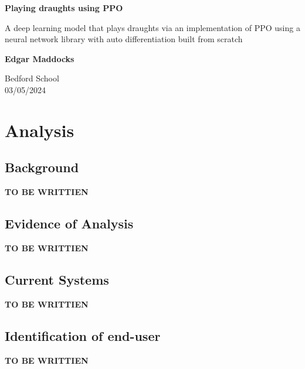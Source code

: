 \documentclass{article}
\begin{document}
\begin{titlepage}
    \begin{center}
        \vspace*{1cm}
            
        \Huge
        \textbf{Playing draughts using PPO}
            
        \vspace{0.5cm}
        \LARGE
        A deep learning model that plays draughts via an implementation of PPO using a neural network library with auto differentiation built from scratch
            
        \vspace{1.5cm}
            
        \textbf{Edgar Maddocks}
            
        \vfill
            
        \vspace{0.8cm}
                        
        \Large
        Bedford School\\
        03/05/2024\\
            
    \end{center}
\end{titlepage}

    \pagebreak

    \tableofcontents

    \section{Analysis}
    \subsection{Background}
    \textbf{TO BE WRITTIEN}

    \subsection{Evidence of Analysis}
    \textbf{TO BE WRITTIEN}

    \subsection{Current Systems}
    \textbf{TO BE WRITTIEN}
    
    \subsection{Identification of end-user}
    \textbf{TO BE WRITTIEN}
    
\end{document}

